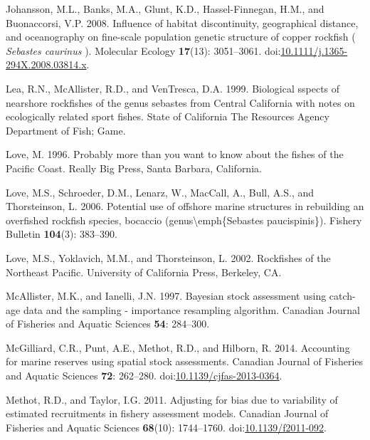 \documentclass[11pt,
  english,
  letterpaper,
]{article}
\newlength{\cslhangindent}
\newenvironment{CSLReferences}[2] %
 {%
  \setlength{\parindent}{0pt}
  \ifodd #1 \everypar{\setlength{\hangindent}{\cslhangindent}}\ignorespaces\fi
  \ifnum #2 > 0
  \setlength{\parskip}{#2\baselineskip}
  \fi
 }%
 {}
\begin{document}
\begin{CSLReferences}{1}{0}
\leavevmode{}%
Johansson, M.L., Banks, M.A., Glunt, K.D., Hassel-Finnegan, H.M., and Buonaccorsi, V.P. 2008. Influence of habitat discontinuity, geographical distance, and oceanography on fine-scale population genetic structure of copper rockfish ( \emph{{Sebastes} caurinus} ). Molecular Ecology \textbf{17}(13): 3051--3061. doi:\href{https://doi.org/10.1111/j.1365-294X.2008.03814.x}{10.1111/j.1365-294X.2008.03814.x}.

\leavevmode{}%
Lea, R.N., McAllister, R.D., and VenTresca, D.A. 1999. Biological sspects of nearshore rockfishes of the genus sebastes from {Central} {California} with notes on ecologically related sport fishes. State of California The Resources Agency Department of Fish; Game.

\leavevmode{}%
Love, M. 1996. Probably more than you want to know about the fishes of the {Pacific} {Coast}. Really Big Press, Santa Barbara, California.

\leavevmode{}%
Love, M.S., Schroeder, D.M., Lenarz, W., MacCall, A., Bull, A.S., and Thorsteinson, L. 2006. Potential use of offshore marine structures in rebuilding an overfished rockfish species, bocaccio (genus{\textbackslash{}}emph\{{Sebastes} paucispinis\}). Fishery Bulletin \textbf{104}(3): 383--390.

\leavevmode{}%
Love, M.S., Yoklavich, M.M., and Thorsteinson, L. 2002. Rockfishes of the {Northeast} {Pacific}. University of California Press, Berkeley, CA.

\leavevmode{}%
McAllister, M.K., and Ianelli, J.N. 1997. Bayesian stock assessment using catch-age data and the sampling - importance resampling algorithm. Canadian Journal of Fisheries and Aquatic Sciences \textbf{54}: 284--300.

\leavevmode{}%
McGilliard, C.R., Punt, A.E., Methot, R.D., and Hilborn, R. 2014. Accounting for marine reserves using spatial stock assessments. Canadian Journal of Fisheries and Aquatic Sciences \textbf{72}: 262--280. doi:\href{https://doi.org/10.1139/cjfas-2013-0364}{10.1139/cjfas-2013-0364}.

\leavevmode{}%
Methot, R.D., and Taylor, I.G. 2011. Adjusting for bias due to variability of estimated recruitments in fishery assessment models. Canadian Journal of Fisheries and Aquatic Sciences \textbf{68}(10): 1744--1760. doi:\href{https://doi.org/10.1139/f2011-092}{10.1139/f2011-092}.


\end{CSLReferences}
\end{document}
